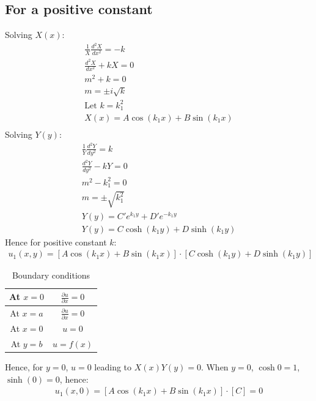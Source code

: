 \documentclass[11pt]{article}
\numberwithin{equation}{section}
\begin{document}
\subsection*{For a positive constant}
Solving $X(x)$:
\begin{gather}
  \frac{1}{X}\frac{d^2X}{dx^2} = -k\\
  \frac{d^2X}{dx^2} + kX = 0\\
  m^2 + k = 0\\
  m = \pm i\sqrt{k}\\
  \textrm{Let } k = k_1^2\\
  X(x) = A\cos{\left(k_1 x\right)} + B\sin{\left(k_1 x\right)}\\
\end{gather}
Solving $Y(y)$:
\begin{gather}
  \frac{1}{Y}\frac{d^2 Y}{dy^2} = k\\
  \frac{d^2 Y}{dy^2} - kY = 0\\
  m^2 - k_1^2 = 0\\
  m = \pm \sqrt{k_1^2}\\
  Y(y) = C'e^{k_1 y} + D'e^{-k_1 y}\\
  Y(y) = C \cosh{\left(k_1 y\right)} + D \sinh{\left(k_1 y\right)}
\end{gather}
Hence for positive constant $k$:
\begin{gather}
  u_1(x,y) = \left[ A\cos{\left(k_1 x\right)} + B\sin{\left(k_1 x\right)} \right] \cdot \left[ C \cosh{\left(k_1 y\right)} + D \sinh{\left(k_1 y\right)} \right]
\end{gather}
\begin{table}[H]
  \begin{center}
  \begin{tabular}{|c|c|}
  \hline
  At $x = 0$ & $\frac{\partial u}{\partial x} = 0$\\
  \hline
  At $x = a$ & $\frac{\partial u}{\partial x} = 0$\\
  \hline
  At $x =0$ & $u = 0$\\
  \hline 
  At $y = b$ & $u = f(x)$\\
  \hline
  \end{tabular}
  \caption{Boundary conditions}
  \end{center}
\end{table}
Hence, for $y = 0$, $u = 0$ leading to $X(x) Y(y) = 0$. When $y = 0$, $\cosh{0} = 1$, $\sinh(0) = 0$, hence:
\begin{gather}
  u_1 (x, 0) = \left[ A\cos{\left(k_1 x\right)} + B\sin{\left(k_1 x\right)} \right] \cdot \left[ C \right] = 0
\end{gather}
\end{document}
